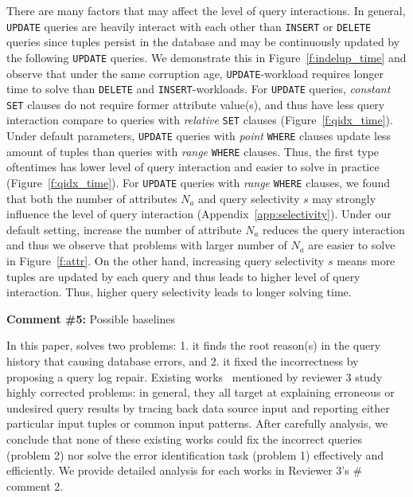 There are many factors that may affect the level of query interactions. In
general, \texttt{UPDATE} queries are heavily interact with each other than
\texttt{INSERT} or \texttt{DELETE} queries since tuples persist in the
database and may be continuously updated by the following \texttt{UPDATE}
queries. We demonstrate this in Figure~\ref{f:indelup_time} and observe that
under the same corruption age, \texttt{UPDATE}-workload requires longer time
to solve than \texttt{DELETE} and \texttt{INSERT}-workloads. For
\texttt{UPDATE} queries, \textit{constant} \texttt{SET} clauses do not require
former attribute value(s), and thus have less query interaction compare to
queries with \textit{relative} \texttt{SET} clauses
(Figure~\ref{f:qidx_time}). Under default parameters, \texttt{UPDATE} queries
with \textit{point} \texttt{WHERE} clauses update less amount of tuples than
queries with \textit{range} \texttt{WHERE} clauses. Thus, the first type
oftentimes has lower level of query interaction and easier to solve in
practice (Figure~\ref{f:qidx_time}). For \texttt{UPDATE} queries with
\textit{range} \texttt{WHERE} clauses, we found that both the number of
attributes $N_a$ and query selectivity $s$ may strongly influence the level of
query interaction (Appendix~\ref{app:selectivity}). Under our default setting,
increase the number of attribute $N_a$ reduces the query interaction and thus
we observe that problems with larger number of $N_a$ are easier to solve in
Figure~\ref{f:attr}. On the other hand, increasing query selectivity $s$ means
more tuples are updated by each query and thus leads to higher level of query
interaction. Thus, higher query selectivity leads to longer solving time.



\comskip

\noindent
\textbf{Comment \#5:} Possible baselines
\begin{quote}
\end{quote}

In this paper, \sys solves two problems: 1. it finds the root reason(s) in the
query history that causing database errors, and 2. it fixed the incorrectness
by proposing a query log repair. Existing works~\cite{Wu13, roy2014formal,
chalamalla2014,meliou2011tracing} mentioned by reviewer 3 study highly
corrected problems: in general, they all target at explaining erroneous or
undesired query results by tracing back data source input and reporting either
particular input tuples or common input patterns. After carefully analysis, we
conclude that none of these existing works could fix the incorrect queries
(problem 2) nor solve the error identification task (problem 1) effectively
and efficiently. We provide detailed analysis for each works in Reviewer 3's
\# comment 2.
